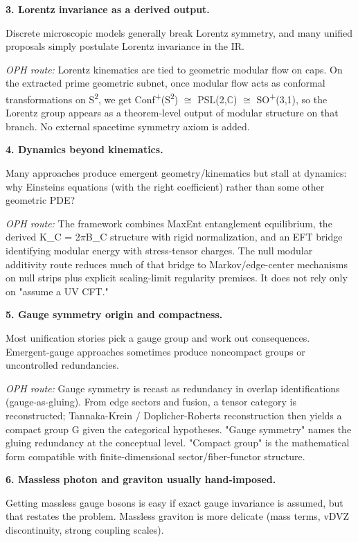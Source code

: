 \textbf{3. Lorentz invariance as a derived output.}

Discrete microscopic models generally break Lorentz symmetry, and many unified proposals simply postulate Lorentz invariance in the IR.

\emph{OPH route:} Lorentz kinematics are tied to geometric modular flow on caps. On the extracted prime geometric subnet, once modular flow acts as conformal transformations on S\textsuperscript{2}, we get Conf\textsuperscript{+}(S\textsuperscript{2}) \ensuremath{\cong} PSL(2,\ensuremath{\mathbb{C}}) \ensuremath{\cong} SO\textsuperscript{+}(3,1), so the Lorentz group appears as a theorem-level output of modular structure on that branch. No external spacetime symmetry axiom is added.

\textbf{4. Dynamics beyond kinematics.}

Many approaches produce emergent geometry/kinematics but stall at dynamics: why Einstein\textquotesingle s equations (with the right coefficient) rather than some other geometric PDE?

\emph{OPH route:} The framework combines MaxEnt entanglement equilibrium, the derived K\_C = 2\ensuremath{\pi}B\_C structure with rigid normalization, and an EFT bridge identifying modular energy with stress-tensor charges. The null modular additivity route reduces much of that bridge to Markov/edge-center mechanisms on null strips plus explicit scaling-limit regularity premises. It does not rely only on "assume a UV CFT."

\textbf{5. Gauge symmetry origin and compactness.}

Most unification stories pick a gauge group and work out consequences. Emergent-gauge approaches sometimes produce noncompact groups or uncontrolled redundancies.

\emph{OPH route:} Gauge symmetry is recast as redundancy in overlap identifications (gauge-as-gluing). From edge sectors and fusion, a tensor category is reconstructed; Tannaka-Krein / Doplicher-Roberts reconstruction then yields a compact group G given the categorical hypotheses. "Gauge symmetry" names the gluing redundancy at the conceptual level. "Compact group" is the mathematical form compatible with finite-dimensional sector/fiber-functor structure.

\textbf{6. Massless photon and graviton usually hand-imposed.}

Getting massless gauge bosons is easy if exact gauge invariance is assumed, but that restates the problem. Massless graviton is more delicate (mass terms, vDVZ discontinuity, strong coupling scales).

